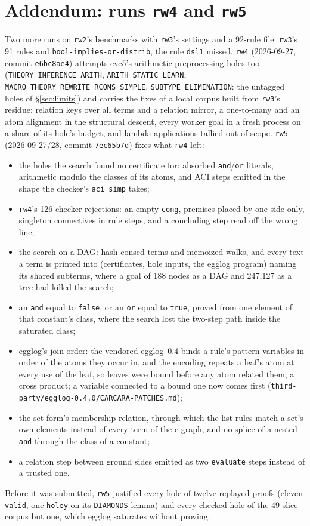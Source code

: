 \documentclass[11pt,a4paper]{article}
\newcommand{\code}[1]{\texttt{#1}}
\begin{document}
\section{Addendum: runs \code{rw4} and \code{rw5}}\label{sec:rw5}

Two more runs on \code{rw2}'s benchmarks with \code{rw3}'s settings and a
92-rule file: \code{rw3}'s 91 rules and \code{bool-implies-or-distrib}, the
rule \code{dsl1} missed. \code{rw4} (2026-09-27, commit \code{e6bc8ae4})
attempts cvc5's arithmetic preprocessing holes too
(\code{THEORY\_INFERENCE\_ARITH}, \code{ARITH\_STATIC\_LEARN},
\code{MACRO\_THEORY\_REWRITE\_RCONS\_SIMPLE}, \code{SUBTYPE\_ELIMINATION}:
the untagged holes of \S\ref{sec:limits}) and carries the fixes of a local
corpus built from \code{rw3}'s residue: relation keys over all terms and a
relation mirror, a one-to-many and an atom alignment in the structural
descent, every worker goal in a fresh process on a share of its hole's
budget, and lambda applications tallied out of scope. \code{rw5}
(2026-09-27/28, commit \code{7ec65b7d}) fixes what \code{rw4} left:
\begin{itemize}
  \item the holes the search found no certificate for: absorbed
    \code{and}/\code{or} literals, arithmetic modulo the classes of its
    atoms, and ACI steps emitted in the shape the checker's
    \code{aci\_simp} takes;
  \item \code{rw4}'s 126 checker rejections: an empty \code{cong},
    premises placed by one side only, singleton connectives in rule steps,
    and a concluding step read off the wrong line;
  \item the search on a DAG: hash-consed terms and memoized walks, and
    every text a term is printed into (certificates, hole inputs, the egglog
    program) naming its shared subterms, where a goal of 188 nodes as a DAG
    and 247,127 as a tree had killed the search;
  \item an \code{and} equal to \code{false}, or an \code{or} equal to
    \code{true}, proved from one element of that constant's class, where
    the search lost the two-step path inside the saturated class;
  \item egglog's join order: the vendored egglog~0.4 binds a rule's pattern
    variables in order of the atoms they occur in, and the encoding repeats
    a leaf's atom at every use of the leaf, so leaves were bound before any
    atom related them, a cross product; a variable connected to a bound one
    now comes first (\code{third-party/egglog-0.4.0/CARCARA-PATCHES.md});
  \item the set form's membership relation, through which the list rules
    match a set's own elements instead of every term of the e-graph, and no
    splice of a nested \code{and} through the class of a constant;
  \item a relation step between ground sides emitted as two
    \code{evaluate} steps instead of a trusted one.
\end{itemize}
Before it was submitted, \code{rw5} justified every hole of twelve replayed
proofs (eleven \code{valid}, one \code{holey} on its \code{DIAMONDS} lemma)
and every checked hole of the 49-slice corpus but one, which egglog
saturates without proving.
\end{document}
